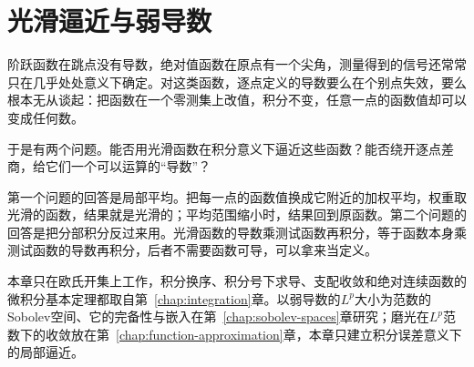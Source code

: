 \chapter{光滑逼近与弱导数}
\label{chap:smoothing-weak-derivatives}

阶跃函数在跳点没有导数，绝对值函数在原点有一个尖角，测量得到的信号还常常只在几乎处处意义下确定。对这类函数，逐点定义的导数要么在个别点失效，要么根本无从谈起：把函数在一个零测集上改值，积分不变，任意一点的函数值却可以变成任何数。

于是有两个问题。能否用光滑函数在积分意义下逼近这些函数？能否绕开逐点差商，给它们一个可以运算的“导数”？

第一个问题的回答是局部平均。把每一点的函数值换成它附近的加权平均，权重取光滑的函数，结果就是光滑的；平均范围缩小时，结果回到原函数。第二个问题的回答是把分部积分反过来用。光滑函数的导数乘测试函数再积分，等于函数本身乘测试函数的导数再积分，后者不需要函数可导，可以拿来当定义。

本章只在欧氏开集上工作，积分换序、积分号下求导、支配收敛和绝对连续函数的微积分基本定理都取自第~\ref{chap:integration}章。以弱导数的$L^p$大小为范数的Sobolev空间、它的完备性与嵌入在第~\ref{chap:sobolev-spaces}章研究；磨光在$L^p$范数下的收敛放在第~\ref{chap:function-approximation}章，本章只建立积分误差意义下的局部逼近。




